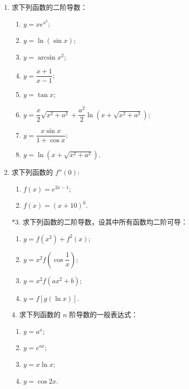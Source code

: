 \begin{enumerate}\setlength{\itemsep}{7pt}
    \item 求下列函数的二阶导数：
    \begin{enumerate}[(1)]\setlength{\itemsep}{5pt}\setlength{\topsep}{15pt}
        \item $y=xe^{x^2}$;
        \item $y=\ln(\sin x)$;
        \item $y=\arcsin x^2$;
        \item $y=\dfrac{x+1}{x-1}$;
        \item $y=\tan x$;
        \item $y=\dfrac{x}{2}\sqrt{x^2+a^2}+\dfrac{a^2}{2}\ln(x+\sqrt{x^2+a^2})$;
        \item $y=\dfrac{x\sin x}{1+\cos x}$;
        \item $y=\ln(x+\sqrt{x^2+a^2})$.
    \end{enumerate}

    \item 求下列函数的 $f''(0)$:
    \begin{enumerate}[(1)]\setlength{\itemsep}{5pt}\setlength{\topsep}{15pt}
        \item $f(x)=e^{2x-1}$;
        \item $f(x)=(x+10)^6$.
    \end{enumerate}

    \item[*3.] 求下列函数的二阶导数，设其中所有函数均二阶可导：
    \begin{enumerate}[(1)]\setlength{\itemsep}{5pt}\setlength{\topsep}{15pt}
        \item $y=f(x^2)+f^2(x)$;
        \item $y=x^2f(\cos\dfrac{1}{x})$;
        \item $y=x^2f(ax^2+b)$;
        \item $y=f[g(\ln x)]$.
    \end{enumerate}

    \item[4.] 求下列函数的 $n$ 阶导数的一般表达式：
    \begin{enumerate}[(1)]\setlength{\itemsep}{5pt}\setlength{\topsep}{15pt}
        \item $y=a^x$;
        \item $y=e^{ax}$;
        \item $y=x\ln x$;
        \item $y=\cos 2x$.
    \end{enumerate}


\end{enumerate}
